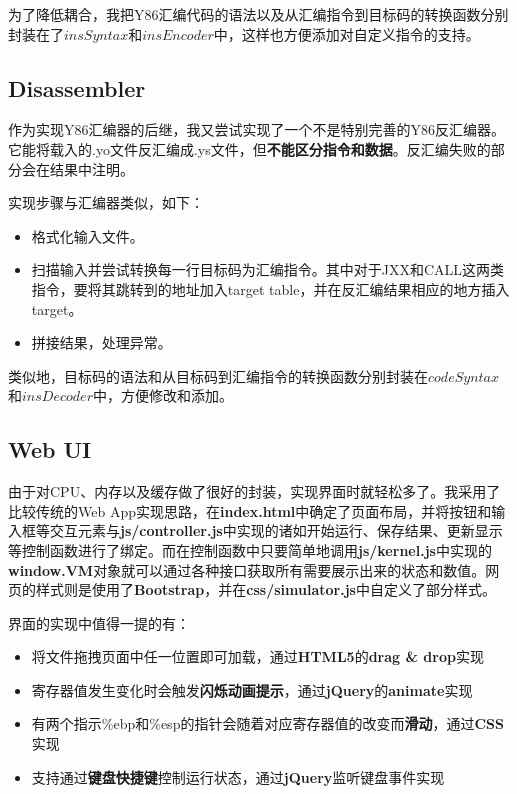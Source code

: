 为了降低耦合，我把Y86汇编代码的语法以及从汇编指令到目标码的转换函数分别封装在了$insSyntax$和$insEncoder$中，这样也方便添加对自定义指令的支持。

\subsection{Disassembler}

作为实现Y86汇编器的后继，我又尝试实现了一个不是特别完善的Y86反汇编器。它能将载入的.yo文件反汇编成.ys文件，但{\bf 不能区分指令和数据}。反汇编失败的部分会在结果中注明。

实现步骤与汇编器类似，如下：

\begin{itemize}
\item 格式化输入文件。
\item 扫描输入并尝试转换每一行目标码为汇编指令。其中对于JXX和CALL这两类指令，要将其跳转到的地址加入target table，并在反汇编结果相应的地方插入target。
\item 拼接结果，处理异常。
\end{itemize}

类似地，目标码的语法和从目标码到汇编指令的转换函数分别封装在$codeSyntax$和$insDecoder$中，方便修改和添加。

\subsection{Web UI}

由于对CPU、内存以及缓存做了很好的封装，实现界面时就轻松多了。我采用了比较传统的Web App实现思路，在{\bf index.html}中确定了页面布局，并将按钮和输入框等交互元素与{\bf js/controller.js}中实现的诸如开始运行、保存结果、更新显示等控制函数进行了绑定。而在控制函数中只要简单地调用{\bf js/kernel.js}中实现的{\bf window.VM}对象就可以通过各种接口获取所有需要展示出来的状态和数值。网页的样式则是使用了{\bf Bootstrap}，并在{\bf css/simulator.js}中自定义了部分样式。

界面的实现中值得一提的有：
\begin{itemize}
\item 将文件拖拽页面中任一位置即可加载，通过{\bf HTML5}的{\bf drag \& drop}实现
\item 寄存器值发生变化时会触发{\bf 闪烁动画提示}，通过{\bf jQuery}的{\bf animate}实现
\item 有两个指示\%ebp和\%esp的指针会随着对应寄存器值的改变而{\bf 滑动}，通过{\bf CSS}实现
\item 支持通过{\bf 键盘快捷键}控制运行状态，通过{\bf jQuery}监听键盘事件实现
\end{itemize}

